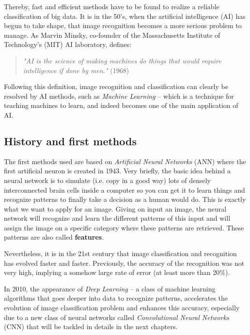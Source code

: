 \documentclass[11pt, openany]{report}
\theoremstyle{plain}
\theoremstyle{definition}
\theoremstyle{remark}
\begin{document}
Thereby, fast and efficient methods have to be found to realize a reliable classification of big data. It is in the 50's, when the artificial intelligence (AI) has begun to take shape, that image recognition becomes a more serious problem to manage. As Marvin Minsky, co-founder of the Massachusetts Institute of Technology's (MIT) AI laboratory, defines: 
\begin{quote}
\textit{"AI is the science of making machines do things that would require intelligence if done by men."} (1968)
\end{quote}      

Following this definition, image recognition and classification can clearly be resolved by AI methods, such as \textit{Machine Learning} -- which is a technique for teaching machines to learn, and indeed becomes one of the main application of AI. \\

\subsection{History and first methods}

The first methods used are based on \textit{Artificial Neural Networks} (ANN) where the first artificial neuron is created in 1943. Very briefly, the basic idea behind a neural network is to simulate (i.e. copy in a good way) lots of densely interconnected brain cells inside a computer so you can get it to learn things and recognize patterns to finally take a decision as a human would do. %
This is exactly what we want to apply for an image. Giving on input an image, the neural network will recognize and learn the different patterns of this input and will assign the image on a specific category where these patterns are retrieved. These patterns are also called \textbf{features}.

Nevertheless, it is in the 21st century that image classification and recognition has evolved faster and faster. Previously, the accuracy of the recognition was not very high, implying a somehow large rate of error (at least more than 20\%).

In 2010, the appearance of \textit{Deep Learning} -- a class of machine learning algorithms that goes deeper into data to recognize patterns, accelerates the evolution of image classification problem and enhances this accuracy, especially due to a new class of neural networks called \textit{Convolutional Neural Networks} (CNN) that will be tackled in details in the next chapters.  %
\end{document}
